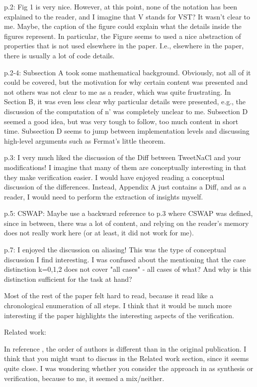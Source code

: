 p.2: Fig 1 is very nice. However, at this point, none of the notation has been
explained to the reader, and I imagine that V stands for VST? It wasn't clear to
me. Maybe, the caption of the figure could explain what the details inside the
figures represent. In particular, the Figure seems to used a nice abstraction of
properties that is not used elsewhere in the paper. I.e., elsewhere in the paper,
there is usually a lot of code details.

p.2-4: Subsection A took some mathematical background. Obviously, not all of it
could be covered, but the motivation for why certain content was presented and
not others was not clear to me as a reader, which was quite frustrating. In
Section B, it was even less clear why particular details were presented, e.g.,
the discussion of the computation of n' was completely unclear to me.
Subsection D seemed a good idea, but was very tough to follow, too much content
in short time. Subsection D seems to jump between implementation levels and
discussing high-level arguments such as Fermat's little theorem.

p.3: I very much liked the discussion of the Diff between TweetNaCl and your
modifications! I imagine that many of them are conceptually interesting in that
they make verification easier. I would have enjoyed reading a conceptual
discussion of the differences. Instead, Appendix A just contains a Diff, and as
a reader, I would need to perform the extraction of insights myself.

p.5: CSWAP: Maybe use a backward reference to p.3 where CSWAP was defined, since
in between, there was a lot of content, and relying on the reader's memory does
not really work here (or at least, it did not work for me).

p.7: I enjoyed the discussion on aliasing! This was the type of conceptual
discussion I find interesting. I was confused about the mentioning that the case
distinction k=0,1,2 does not cover "all cases" - all cases of what? And why is
this distinction sufficient for the task at hand?

Most of the rest of the paper felt hard to read, because it read like a
chronological enumeration of all steps. I think that it would be much more
interesting if the paper highlights the interesting aspects of the verification.

Related work:

In reference \cite{DBLP:journals/corr/BhargavanDFHPRR17}, the order of authors
is different than in the original publication. I think that you might want to
discuss \cite{DBLP:journals/corr/BhargavanDFHPRR17} in the Related work
section, since it seems quite close. I was wondering whether you consider the
approach in \cite{DBLP:journals/corr/BhargavanDFHPRR17} as synthesis or
verification, because to me, it seemed a mix/neither.

